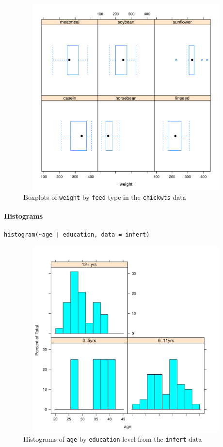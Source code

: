 \documentclass[captions=tableheading]{scrbook}
\begin{document}
\begin{figure}[th]
    \includegraphics[width=5in, height=4in]{img/bwplot.pdf}
    \caption{Boxplots of \texttt{weight} by \texttt{feed} type in the \texttt{chickwts} data}
    \label{fig:bwplot}
  \end{figure}


\paragraph*{Histograms}


\begin{verbatim}
histogram(~age | education, data = infert)
\end{verbatim}





\begin{figure}[th]
    \includegraphics[width=5in, height=4in]{img/histograms-lattice.pdf}
    \caption[Histograms of \texttt{age} by \texttt{education} level]{Histograms of \texttt{age} by \texttt{education} level from the \texttt{infert} data}
    \label{fig:histograms-lattice}
  \end{figure}
\end{document}
